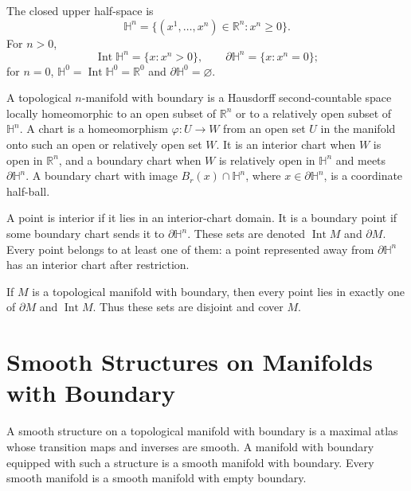 \begin{definition}
\label{def:1-5-extra-1}




The closed upper half-space is
\[
\mathbb H^n=\{(x^1,\ldots,x^n)\in\mathbb R^n:x^n\geq0\}.
\]
For $n>0$,
\[
\operatorname{Int}\mathbb H^n=\{x:x^n>0\},\qquad
\partial\mathbb H^n=\{x:x^n=0\};
\]
for $n=0$, $\mathbb H^0=\operatorname{Int}\mathbb H^0=\mathbb R^0$ and
$\partial\mathbb H^0=\varnothing$.

A topological $n$-manifold with boundary is a Hausdorff second-countable space
locally homeomorphic to an open subset of $\mathbb R^n$ or to a relatively
open subset of $\mathbb H^n$. A chart is a homeomorphism
$\varphi:U\to W$ from an open set $U$ in the manifold onto such an open or
relatively open set $W$. It is an interior chart when $W$ is open in
$\mathbb R^n$, and a boundary chart when $W$ is relatively open in
$\mathbb H^n$ and meets $\partial\mathbb H^n$. A boundary chart with image
$B_r(x)\cap\mathbb H^n$, where $x\in\partial\mathbb H^n$, is a coordinate
half-ball.

A point is interior if it lies in an interior-chart domain. It is a boundary
point if some boundary chart sends it to $\partial\mathbb H^n$. These sets are
denoted $\operatorname{Int}M$ and $\partial M$. Every point belongs to at least
one of them: a point represented away from $\partial\mathbb H^n$ has an
interior chart after restriction.
\end{definition}

\begin{theorem}
\label{thm:1-37}



If $M$ is a topological manifold with boundary, then every point lies in
exactly one of $\partial M$ and $\operatorname{Int}M$. Thus these sets are
disjoint and cover $M$.
\end{theorem}


\section{Smooth Structures on Manifolds with Boundary}

\begin{definition}
\label{def:1-6-extra-2}




A smooth structure on a topological manifold with boundary is a maximal atlas
whose transition maps and inverses are smooth. A manifold with boundary
equipped with such a structure is a smooth manifold with boundary. Every
smooth manifold is a smooth manifold with empty boundary.
\end{definition}

